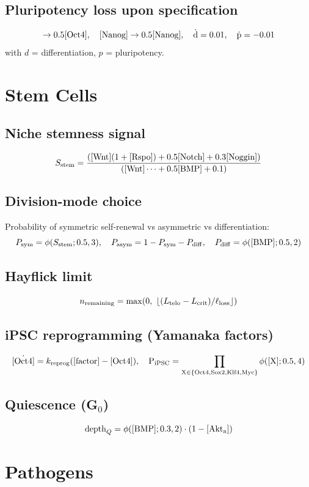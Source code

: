 \documentclass[11pt,a4paper]{article}
\newcommand{\eq}[1]{\begin{equation}#1\end{equation}}
\begin{document}
\subsection{Pluripotency loss upon specification}
\eq{ [\rm Oct4]\to 0.5[\rm Oct4],\quad [\rm Nanog]\to 0.5[\rm Nanog],\quad \dot d=0.01,\quad \dot p=-0.01 }
with $d$ = differentiation, $p$ = pluripotency.

\clearpage
\section{Stem Cells}
\label{sec:stem}

\subsection{Niche stemness signal}
\eq{ S_{\rm stem}=\frac{([\rm Wnt](1+[\rm Rspo])+0.5[\rm Notch]+0.3[\rm Noggin])}{([\rm Wnt]\cdots+0.5[\rm BMP]+0.1)} }

\subsection{Division-mode choice}
Probability of symmetric self-renewal vs asymmetric vs differentiation:
\eq{ P_{\rm sym}=\phi(S_{\rm stem};0.5,3),\quad P_{\rm asym}=1-P_{\rm sym}-P_{\rm diff},\quad P_{\rm diff}=\phi([\rm BMP];0.5,2) }

\subsection{Hayflick limit}
\eq{ n_{\rm remaining}=\max\!\left(0,\ \lfloor (L_{\rm telo}-L_{\rm crit})/\ell_{\rm loss}\rfloor\right) }

\subsection{iPSC reprogramming (Yamanaka factors)}
\eq{ \dot{[\rm Oct4]}=k_{\rm reprog}([\rm factor]-[\rm Oct4]),\quad P_{\rm iPSC}=\prod_{X\in\{\rm Oct4,Sox2,Klf4,Myc\}}\phi([X];0.5,4) }

\subsection{Quiescence (G$_0$)}
\eq{ \mathrm{depth}_{Q}=\phi([\rm BMP];0.3,2)\cdot(1-[\rm Akt_a]) }

\clearpage
\section{Pathogens}
\label{sec:path}
\end{document}
